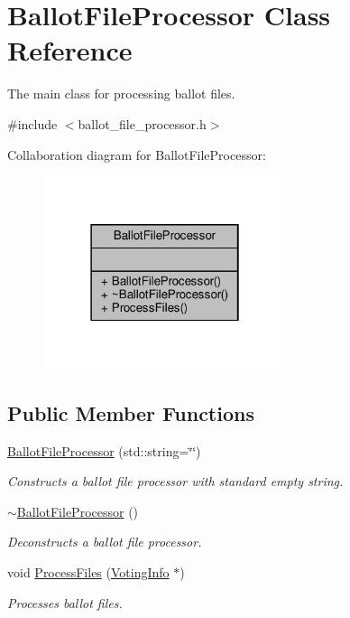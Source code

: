 \hypertarget{classBallotFileProcessor}{}\section{Ballot\+File\+Processor Class Reference}
\label{classBallotFileProcessor}


The main class for processing ballot files.  




{\ttfamily \#include $<$ballot\+\_\+file\+\_\+processor.\+h$>$}



Collaboration diagram for Ballot\+File\+Processor\+:\nopagebreak
\begin{figure}[H]
\begin{center}
\leavevmode
\includegraphics[width=202pt]{classBallotFileProcessor__coll__graph}
\end{center}
\end{figure}
\subsection*{Public Member Functions}
\begin{DoxyCompactItemize}
\item 
\hyperlink{classBallotFileProcessor_aadc47aedf9172bfc26b2b6324dc40576}{Ballot\+File\+Processor} (std\+::string=\char`\"{}\char`\"{})
\begin{DoxyCompactList}\small\item\em Constructs a ballot file processor with standard empty string. \end{DoxyCompactList}\item 
\mbox{\label{classBallotFileProcessor_a372429408537c8919b969a23c3cc7e41}} 
\hyperlink{classBallotFileProcessor_a372429408537c8919b969a23c3cc7e41}{$\sim$\+Ballot\+File\+Processor} ()
\begin{DoxyCompactList}\small\item\em Deconstructs a ballot file processor. \end{DoxyCompactList}\item 
void \hyperlink{classBallotFileProcessor_a3d25f1db840f21ab7d19f4b4898193c9}{Process\+Files} (\hyperlink{classVotingInfo}{Voting\+Info} $\ast$)
\begin{DoxyCompactList}\small\item\em Processes ballot files. \end{DoxyCompactList}\end{DoxyCompactItemize}


